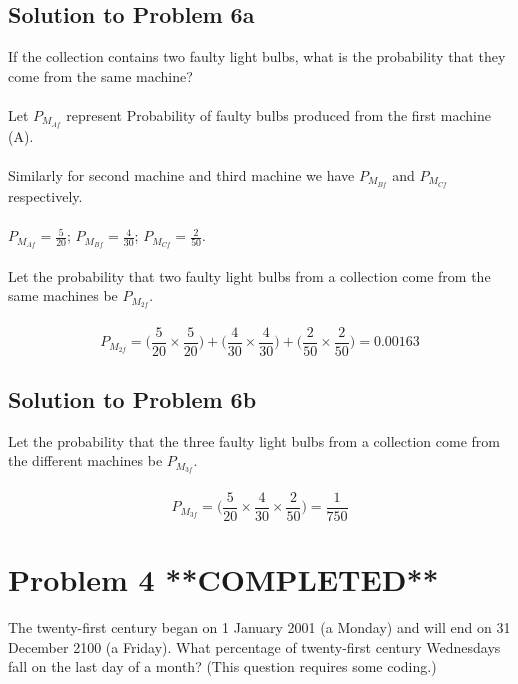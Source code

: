 \documentclass{article}
\begin{document}
\subsection{Solution to Problem 6a}
If the collection contains two faulty light bulbs, what is the probability that they come from the same machine? \\\\
Let $P_{M_{Af}}$ represent Probability of faulty bulbs produced from the first machine (A). \\ \\
Similarly for second machine and third machine we have $P_{M_{Bf}}$ and $P_{M_{Cf}}$ respectively. \\ \\
$P_{M_{Af}} = \frac{5}{20}$; \enspace $P_{M_{Bf}} = \frac{4}{30}$; \enspace $P_{M_{Cf}} = \frac{2}{50}$. \\ \\

Let the probability that two faulty light bulbs from a collection come from the same machines be $P_{M_{2f}}$. \\\\
$$P_{M_{2f}} = \Big( \frac{5}{20} \times \frac{5}{20}\Big) + \Big( \frac{4}{30} \times \frac{4}{30}\Big) + \Big( \frac{2}{50} \times \frac{2}{50}\Big) = 0.00163$$

\subsection{Solution to Problem 6b}
Let the probability that the three faulty light bulbs from a collection come from the different machines be $P_{M_{3f}}$. \\\\
$$P_{M_{3f}} = \Big( \frac{5}{20} \times \frac{4}{30} \times \frac{2}{50} \Big) = \frac{1}{750}$$

\section{Problem 4 **COMPLETED**}
The twenty-first century began on 1 January 2001 (a Monday) and will end on 31 December 2100 (a Friday). What percentage of twenty-first century Wednesdays fall on the last day of a month? (This question requires some coding.)
\end{document}
